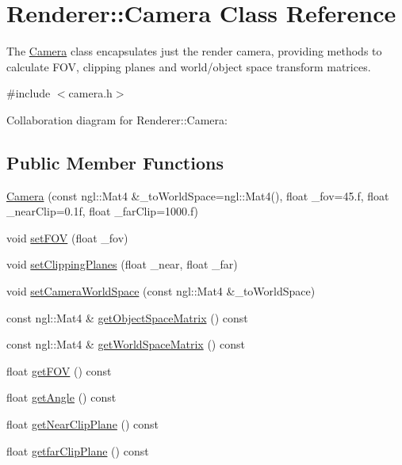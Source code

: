\hypertarget{classRenderer_1_1Camera}{}\section{Renderer\+:\+:Camera Class Reference}
\label{classRenderer_1_1Camera}


The \hyperlink{classRenderer_1_1Camera}{Camera} class encapsulates just the render camera, providing methods to calculate F\+O\+V, clipping planes and world/object space transform matrices.  




{\ttfamily \#include $<$camera.\+h$>$}



Collaboration diagram for Renderer\+:\+:Camera\+:
\subsection*{Public Member Functions}
\begin{DoxyCompactItemize}
\item 
\hyperlink{classRenderer_1_1Camera_ab25a860d30c9fb7988ad68c4d89de8b9}{Camera} (const ngl\+::\+Mat4 \&\+\_\+to\+World\+Space=ngl\+::\+Mat4(), float \+\_\+fov=45.f, float \+\_\+near\+Clip=0.\+1f, float \+\_\+far\+Clip=1000.\+f)
\item 
void \hyperlink{classRenderer_1_1Camera_aa903bf49a467f2bd0c915c12a032a2d3}{set\+F\+O\+V} (float \+\_\+fov)
\item 
void \hyperlink{classRenderer_1_1Camera_a4452d3bce23326607f184c5621fba48d}{set\+Clipping\+Planes} (float \+\_\+near, float \+\_\+far)
\item 
void \hyperlink{classRenderer_1_1Camera_a979318d93dd9fd29d1188b109dbf25e8}{set\+Camera\+World\+Space} (const ngl\+::\+Mat4 \&\+\_\+to\+World\+Space)
\item 
const ngl\+::\+Mat4 \& \hyperlink{classRenderer_1_1Camera_a041846a3c8872e90b001e65319745ece}{get\+Object\+Space\+Matrix} () const 
\item 
const ngl\+::\+Mat4 \& \hyperlink{classRenderer_1_1Camera_a3f6afedf440c05554e7fbf506aea5514}{get\+World\+Space\+Matrix} () const 
\item 
float \hyperlink{classRenderer_1_1Camera_a62a6811e608244e6739bf5d9d4821b94}{get\+F\+O\+V} () const 
\item 
float \hyperlink{classRenderer_1_1Camera_aee5a50c681121ebad8e8bf0a02df4e96}{get\+Angle} () const 
\item 
float \hyperlink{classRenderer_1_1Camera_acf6473a1263096a8309c5f1209066ba4}{get\+Near\+Clip\+Plane} () const 
\item 
float \hyperlink{classRenderer_1_1Camera_a4f31ff2bb69d635467d59ec1e2bd8bfd}{getfar\+Clip\+Plane} () const 
\end{DoxyCompactItemize}


